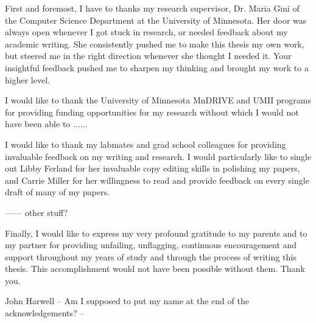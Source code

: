 
First and foremost, I have to thanks my research supervisor, Dr. Maria Gini of
the Computer Science Department at the University of Minnesota. Her door was
always open whenever I got stuck in research, or needed feedback about my
academic writing. She consistently pushed me to make this thesis my own work,
but steered me in the right direction whenever she thought I needed it. Your
insightful feedback pushed me to sharpen my thinking and brought my work to a
higher level.

I would like to thank the University of Minnesota MnDRIVE and UMII programs for
providing funding opportunities for my research without which I would not have
been able to ......

I would like to thank my labmates and grad school colleagues for providing
invaluable feedback on my writing and research. I would particularly like to
single out Libby Ferland for her invaluable copy editing skills in polishing my
papers, and Carrie Miller for her willingness to read and provide feedback on
every single draft of many of my papers.

------ other stuff?

Finally, I would like to express my very profound gratitude to my parents and to
my partner for providing unfailing, unflagging, continuous encouragement and
support throughout my years of study and through the process of writing this
thesis. This accomplishment would not have been possible without them. Thank
you.

John Harwell -- Am I supposed to put my name at the end of the acknowledgements? --

